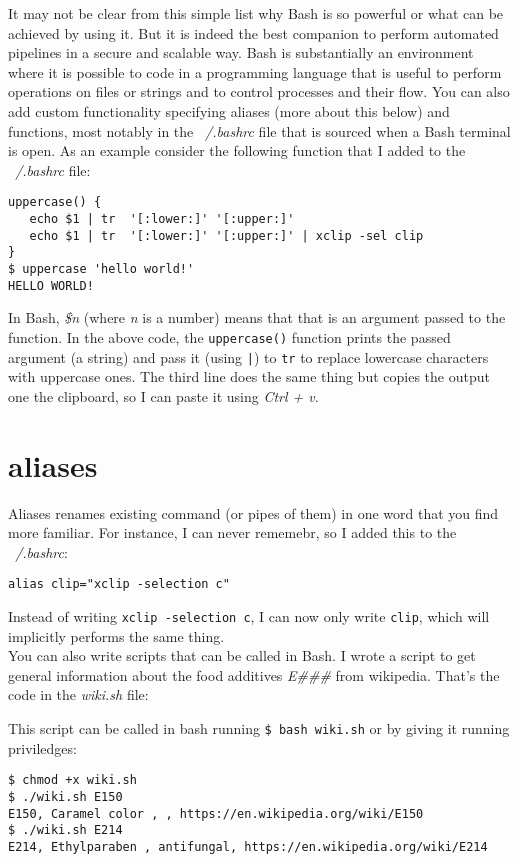 \documentclass{book}
\begin{document}
It may not be clear from this simple list why Bash is so powerful or what can be achieved by using it. But it is indeed the best companion to perform automated pipelines in a secure and scalable way. Bash is substantially an environment where it is possible to code in a programming language that is useful to perform operations on files or strings and to control processes and their flow. You can also add custom functionality specifying aliases (more about this below) and functions, most notably in the \textit{~/.bashrc} file that is sourced when a Bash terminal is open. As an example consider the following function that I added to the \textit{~/.bashrc} file:

\begin{lstlisting}
uppercase() {
   echo $1 | tr  '[:lower:]' '[:upper:]'
   echo $1 | tr  '[:lower:]' '[:upper:]' | xclip -sel clip
}
$ uppercase 'hello world!'
HELLO WORLD!
\end{lstlisting}

In Bash, \textit{\$n} (where \textit{n} is a number) means that that is an argument passed to the function. In the above code, the \texttt{uppercase()} function prints the passed argument (a string) and pass it (using \texttt{|}) to \texttt{tr} to replace lowercase characters with uppercase ones. The third line does the same thing but copies the output one the clipboard, so I can paste it using \textit{Ctrl + v}.

\section{aliases}
Aliases renames existing command (or pipes of them) in one word that you find more familiar. For instance, I can never rememebr, so I added this to the \textit{~/.bashrc}:

\begin{lstlisting}
alias clip="xclip -selection c"
\end{lstlisting}

Instead of writing \lstinline[columns=fixed]{xclip -selection c}, I can now only write \lstinline[columns=fixed]{clip}, which will implicitly performs the same thing.\\

You can also write scripts that can be called in Bash. I wrote a script to get general information about the food additives \textit{E\#\#\#} from wikipedia. That's the code in the \textit{wiki.sh} file:



This script can be called in bash running \lstinline[columns=fixed]{$ bash wiki.sh} or by giving it running priviledges:

\begin{lstlisting}
$ chmod +x wiki.sh
$ ./wiki.sh E150
E150, Caramel color , , https://en.wikipedia.org/wiki/E150
$ ./wiki.sh E214
E214, Ethylparaben , antifungal, https://en.wikipedia.org/wiki/E214
\end{lstlisting}
\end{document}
